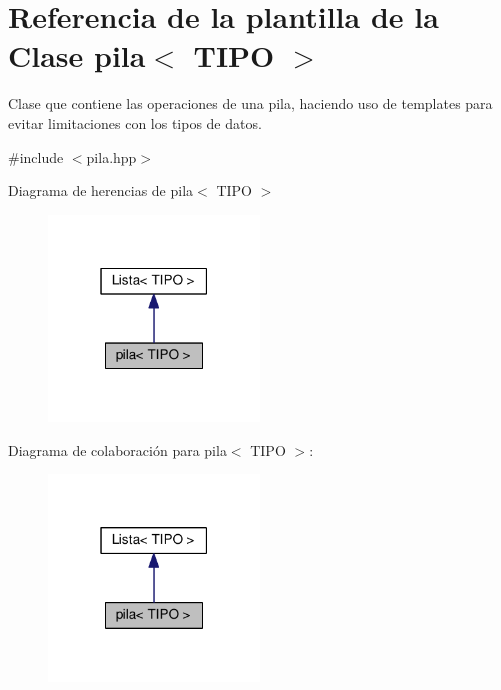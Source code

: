 \hypertarget{classpila}{}\section{Referencia de la plantilla de la Clase pila$<$ T\+I\+PO $>$}
\label{classpila}


Clase que contiene las operaciones de una pila, haciendo uso de templates para evitar limitaciones con los tipos de datos.  




{\ttfamily \#include $<$pila.\+hpp$>$}



Diagrama de herencias de pila$<$ T\+I\+PO $>$\nopagebreak
\begin{figure}[H]
\begin{center}
\leavevmode
\includegraphics[width=159pt]{classpila__inherit__graph}
\end{center}
\end{figure}


Diagrama de colaboración para pila$<$ T\+I\+PO $>$\+:\nopagebreak
\begin{figure}[H]
\begin{center}
\leavevmode
\includegraphics[width=159pt]{classpila__coll__graph}
\end{center}
\end{figure}
